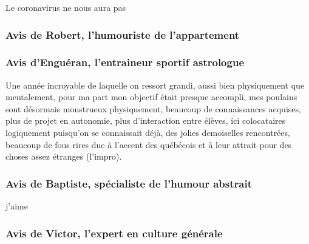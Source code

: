 Le coronavirus ne nous aura pas

\subsubsection{Avis de Robert, l'humouriste de l'appartement}
\subsubsection{Avis d'Enguéran, l'entraineur sportif astrologue}

Une année incroyable de laquelle on ressort grandi, aussi bien physiquement que mentalement, pour ma part mon objectif était presque accompli, mes poulains sont désormais monstrueux physiquement, beaucoup de connaissances acquises, plus de projet en autonomie, plus d’interaction entre élèves, ici colocataires logiquement puisqu’on se connaissait déjà, des jolies demoiselles rencontrées, beaucoup de fous rires due à l’accent des québécois et à leur attrait pour des choses assez étranges (l’impro). 

\subsubsection{Avis de Baptiste, spécialiste de l'humour abstrait}
j'aime
\subsubsection{Avis de Victor, l'expert en culture générale}
